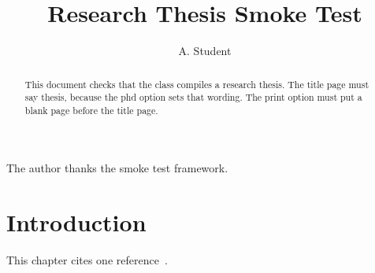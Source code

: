 \documentclass[phd,print,12pt,a4paper]{bangorthesis}
\title{Research Thesis Smoke Test}
\author{A. Student}
\begin{document}
\maketitle
\statementspage
\begin{acknowledgements}
  The author thanks the smoke test framework.
\end{acknowledgements}
\begin{abstract}
  This document checks that the class compiles a research thesis. The
  title page must say thesis, because the phd option sets that wording.
  The print option must put a blank page before the title page.
\end{abstract}
\tables
\chapter{Introduction}
This chapter cites one reference~\autocite{knuth1984}.
\printbibliography
\end{document}
